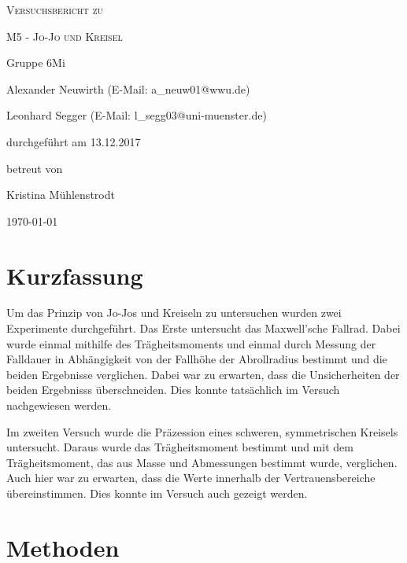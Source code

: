\documentclass[
	a4paper,
	12pt,
	pagesize,
	ngerman
]{scrartcl}
\begin{document}
	
	\begin{titlepage}
		\centering
		{\scshape\LARGE Versuchsbericht zu \par}
		\vspace{1cm}
		{\scshape\huge M5 - Jo-Jo und Kreisel\par}
		\vspace{2.5cm}
		{\LARGE Gruppe 6Mi \par}
		\vspace{0.5cm}
		
		{\large Alexander Neuwirth (E-Mail: a\_neuw01@wwu.de) \par}
		{\large Leonhard Segger (E-Mail: l\_segg03@uni-muenster.de) \par}
		\vfill
		
		durchgeführt am 13.12.2017\par
		betreut von\par
		{\large Kristina Mühlenstrodt} %
		
		\vfill
		
		{\large \today\par}
	\end{titlepage}
	\tableofcontents
	\newpage

	\section{Kurzfassung}
	Um das Prinzip von Jo-Jos und Kreiseln zu untersuchen wurden zwei Experimente durchgeführt.
	Das Erste untersucht das Maxwell'sche Fallrad.
	Dabei wurde einmal mithilfe des Trägheitsmoments und einmal durch Messung der Falldauer in Abhängigkeit von der Fallhöhe der Abrollradius bestimmt und die beiden Ergebnisse verglichen.
	Dabei war zu erwarten, dass die Unsicherheiten der beiden Ergebnisss überschneiden.
	Dies konnte tatsächlich im Versuch nachgewiesen werden.
	\par
	Im zweiten Versuch wurde die Präzession eines schweren, symmetrischen Kreisels untersucht. 
	Daraus wurde das Trägheitsmoment bestimmt und mit dem Trägheitsmoment, das aus Masse und Abmessungen bestimmt wurde, verglichen. %
	Auch hier war zu erwarten, dass die Werte innerhalb der Vertrauensbereiche übereinstimmen.
	Dies konnte im Versuch auch gezeigt werden.
	\section{Methoden}
\end{document}
